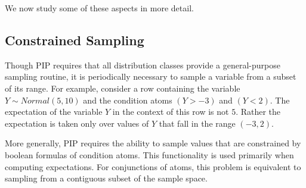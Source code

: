 

\medskip

We now study some of these aspects in more detail.



\subsection{Constrained Sampling}
\label{subsec:csampling}


Though  PIP   requires  that   all  distribution  classes   provide  a
general-purpose  sampling  routine, it  is  periodically necessary  to
sample a variable from a subset of its range.  For example, consider a
row  containing  the variable  $Y \sim Normal(5,10)$  and the  condition
atoms $(Y >  -3)$ and $(Y < 2)$.  The expectation  of the variable $Y$
in the  context of  this row  is not $5$.   Rather the  expectation is
taken only over values of $Y$ that fall in the range $(-3,2)$.

More generally,  PIP requires  the ability to  sample values  that are
constrained   by   boolean   formulas   of  condition   atoms.    This
functionality is used primarily when  computing expectations.  For conjunctions of atoms,  this problem is
equivalent to sampling  from a contiguous subset of  the sample space.

